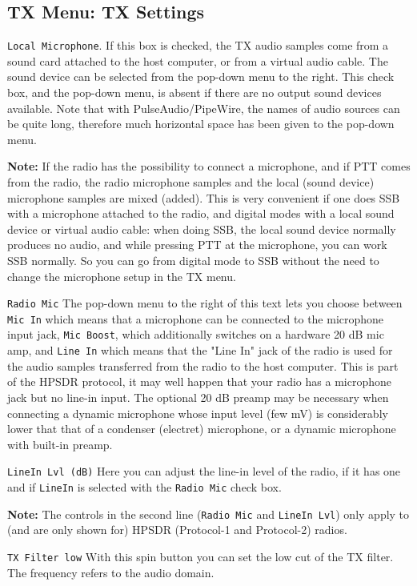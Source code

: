 \documentclass[12pt]{book}
\def\rett#1{\texttt{\color{red}#1}}
\begin{document}
\subsection{TX Menu: TX Settings}

\rett{Local Microphone}. If this box is checked, the TX audio samples come from a sound card
attached to the host computer, or from a virtual audio cable. The sound device can be
selected from the pop-down menu to the right.
 This check box, and the pop-down menu, is absent if
there are no output sound devices available. Note that with PulseAudio/PipeWire, the
names of audio sources can be quite long, therefore much horizontal space has been
given to the pop-down menu.

\textbf{Note:} If the radio has the possibility
to connect a microphone, and if PTT comes from the radio, the radio microphone samples
and the local (sound device) microphone samples are mixed (added). This is very convenient
if one does SSB with a microphone attached to the radio, and digital modes with a
local sound device or virtual audio cable: when doing SSB, the local sound device normally
produces no audio, and while pressing PTT at the microphone, you can work SSB normally.
So you can go from digital mode to SSB without the need to change the microphone setup
in the TX menu.

\rett{Radio Mic} The pop-down menu to the right of this text
 lets you choose between \rett{Mic In} which means
that a microphone can be connected to the microphone input jack, \rett{Mic Boost}, which
additionally switches on a hardware 20 dB mic amp, and \rett{Line In} which means that the
"Line In" jack of the radio is used for the audio samples transferred from the radio to the
host computer. This is part of the HPSDR protocol, it may well happen that your radio has a
microphone jack but no line-in input. The optional 20 dB preamp may be necessary when connecting
a dynamic microphone whose input level (few mV) is considerably lower that that of a
condenser (electret) microphone, or a dynamic microphone with built-in preamp.

\rett{LineIn Lvl (dB)} Here you can adjust the line-in level of the radio, if it
has one and if \rett{LineIn} is selected with the \rett{Radio Mic} check box.

\textbf{Note:} The controls in the second line (\rett{Radio Mic} and \rett{LineIn Lvl}) only
apply to (and are only
shown for) HPSDR (Protocol-1 and Protocol-2) radios.

\rett{TX Filter low} With this spin button you can set the low cut of the TX filter. The
frequency refers to the audio domain.
\end{document}
